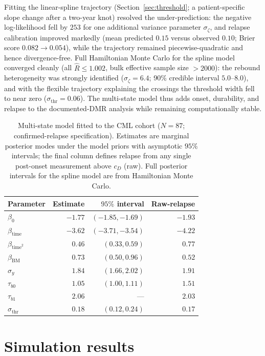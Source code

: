 \documentclass[11pt]{article}
\begin{document}
Fitting the linear-spline trajectory (Section~\ref{sec:threshold}; a
patient-specific slope change after a two-year knot) resolved the
under-prediction: the negative log-likelihood fell by $253$ for one additional
variance parameter $\sigma_\zeta$, and relapse calibration improved markedly
(mean predicted $0.15$ versus observed $0.10$; Brier score $0.082\to0.054$),
while the trajectory remained piecewise-quadratic and hence divergence-free.
Full Hamiltonian Monte Carlo for the spline model converged cleanly (all
$\widehat R\le1.002$, bulk effective sample size $>2000$): the rebound
heterogeneity was strongly identified ($\sigma_\zeta=6.4$; 90\% credible
interval $5.0$--$8.0$), and with the flexible trajectory explaining the
crossings the threshold width fell to near zero ($\sigma_{\mathrm{thr}}=0.06$).
The multi-state model thus adds onset, durability, and relapse to the
documented-DMR analysis while remaining computationally stable.

\begin{table}[!htbp]
\centering
\caption{Multi-state model fitted to the CML cohort ($N=87$; confirmed-relapse specification). Estimates are marginal posterior modes under the model priors with asymptotic $95\%$ intervals; the final column defines relapse from any single post-onset measurement above $c_D$ (raw). Full posterior intervals for the spline model are from Hamiltonian Monte Carlo.}
\label{tab:ms-real}
\small
\begin{tabular}{lrrr}
\toprule
Parameter & Estimate & $95\%$ interval & Raw-relapse\\
\midrule
$\beta_0$ & $-1.77$ & $(-1.85,-1.69)$ & $-1.93$\\
$\beta_{\mathrm{time}}$ & $-3.62$ & $(-3.71,-3.54)$ & $-4.22$\\
$\beta_{\mathrm{time}^2}$ & $0.46$ & $(0.33,0.59)$ & $0.77$\\
$\beta_{\mathrm{BM}}$ & $0.73$ & $(0.50,0.96)$ & $0.52$\\
$\sigma_y$ & $1.84$ & $(1.66,2.02)$ & $1.91$\\
$\tau_{b0}$ & $1.05$ & $(1.00,1.11)$ & $1.51$\\
$\tau_{b1}$ & $2.06$ & --- & $2.03$\\
$\sigma_{\mathrm{thr}}$ & $0.18$ & $(0.12,0.24)$ & $0.17$\\
\bottomrule
\end{tabular}
\end{table}

\section{Simulation results}
\label{sec:simresults}
\end{document}
